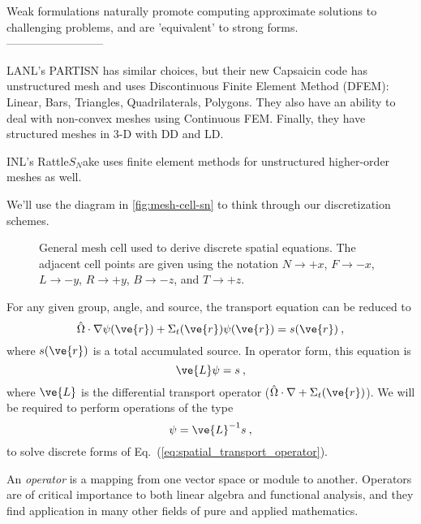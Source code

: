 \documentclass[12pt]{article}
\newcommand{\vOmega}{\ensuremath{\hat{\Omega}}}
\begin{document}
Weak  formulations  naturally  promote  computing  approximate  solutions  to  challenging problems, and are 'equivalent' to strong forms.
\\
--------------------------

LANL's PARTISN has similar choices, but their new Capsaicin code has unstructured mesh and uses Discontinuous Finite Element Method (DFEM): Linear, Bars, Triangles, Quadrilaterals, Polygons. They also have an ability to deal with non-convex meshes using Continuous FEM. Finally, they have structured meshes in 3-D with DD and LD.

INL's Rattle$S_N$ake uses finite element methods for unstructured higher-order
meshes as well.

We'll use the diagram in \autoref{fig:mesh-cell-sn} to think through our discretization schemes.
\begin{figure}[h!]
  \begin{center}
    
  \end{center}
  \caption{General mesh cell used to derive discrete spatial
    equations.  The adjacent cell points are given using the notation
    $N\rightarrow +x$, $F\rightarrow -x$, $L\rightarrow -y$, $R\rightarrow
    +y$, $B\rightarrow -z$, and $T\rightarrow +z$.}
  \label{fig:mesh-cell-sn}
\end{figure}

For any given group, angle, and source, the transport equation can be reduced to
\begin{equation}
  \vOmega\cdot\nabla\psi(\ve{r}) + \Sigma_t(\ve{r})\psi(\ve{r}) =
  s(\ve{r})\:,
  \label{eq:spatial_transport}
\end{equation}
where $s(\ve{r})$ is a total accumulated source.  In operator form, this
equation is
\begin{equation}
  \ve{L}\psi = s\:,
  \label{eq:spatial_transport_operator}
\end{equation}
where $\ve{L}$ is the differential transport operator ($\vOmega\cdot\nabla + \Sigma_t(\ve{r})$).  We will be required to perform operations of the type
\begin{equation}
  \psi = \ve{L}^{-1}s\:,
\end{equation}
to solve discrete forms of Eq.~(\ref{eq:spatial_transport_operator}).  

An \textit{operator} is a mapping from one vector space or module to another. Operators are of critical importance to both linear algebra and functional analysis, and they find application in many other fields of pure and applied mathematics.
\end{document}
